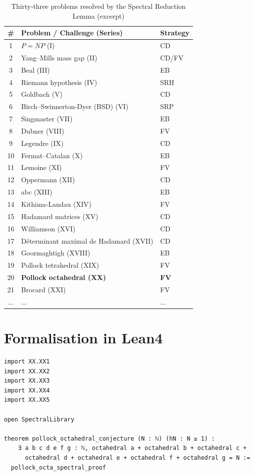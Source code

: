 \documentclass[11pt,a4paper]{article}
\begin{document}
\begin{center}
\small
\begin{longtable}{@{}cll@{}}
\caption{Thirty‑three problems resolved by the Spectral Reduction Lemma (excerpt)}\\
\toprule
\# & Problem / Challenge (Series) & Strategy \\
\midrule
1 & \(P = NP\) (I) & CD \\
2 & Yang–Mills mass gap (II) & CD/FV \\
3 & Beal (III) & EB \\
4 & Riemann hypothesis (IV) & SRH \\
5 & Goldbach (V) & CD \\
6 & Birch–Swinnerton-Dyer (BSD) (VI) & SRP \\
7 & Singmaster (VII) & EB \\
8 & Dubner (VIII) & FV \\
9 & Legendre (IX) & CD \\
10 & Fermat–Catalan (X) & EB \\
11 & Lemoine (XI) & FV \\
12 & Oppermann (XII) & CD \\
13 & abc (XIII) & EB \\
14 & Kithima‑Landau (XIV) & FV \\
15 & Hadamard matrices (XV) & CD \\
16 & Williamson (XVI) & CD \\
17 & Déterminant maximal de Hadamard (XVII) & CD \\
18 & Goormaghtigh (XVIII) & EB \\
19 & Pollock tetrahedral (XIX) & FV \\
20 & \textbf{Pollock octahedral (XX)} & \textbf{FV} \\
21 & Brocard (XXI) & FV \\
... & ... & ... \\
\bottomrule
\end{longtable}
\end{center}

\section{Formalisation in Lean4}

\begin{lstlisting}[style=lean, caption={MainXX.lean (final)}]
import XX.XX1
import XX.XX2
import XX.XX3
import XX.XX4
import XX.XX5

open SpectralLibrary

theorem pollock_octahedral_conjecture (N : ℕ) (hN : N ≥ 1) :
    ∃ a b c d e f g : ℕ, octahedral a + octahedral b + octahedral c +
      octahedral d + octahedral e + octahedral f + octahedral g = N :=
  pollock_octa_spectral_proof
\end{lstlisting}
\end{document}
